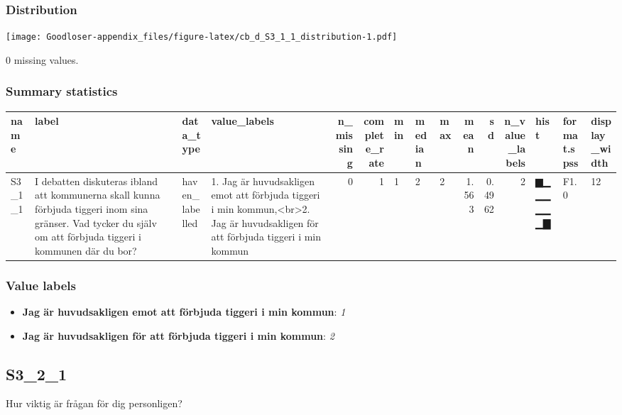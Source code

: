 \documentclass[
]{book}
\providecommand{\tightlist}{%
  \setlength{\itemsep}{0pt}\setlength{\parskip}{0pt}}
\begin{document}
\hypertarget{S3_1_1_distribution}{%
\subsubsection{Distribution}\label{S3_1_1_distribution}}

\texttt{[image: Goodloser-appendix\_files/figure-latex/cb\_d\_S3\_1\_1\_distribution-1.pdf]}

0 missing values.

\hypertarget{S3_1_1_summary}{%
\subsubsection{Summary statistics}\label{S3_1_1_summary}}

\begin{tabular}{l|l|l|l|r|r|l|l|l|r|r|r|l|l|l}
\hline
name & label & data_type & value_labels & n_missing & complete_rate & min & median & max & mean & sd & n_value_labels & hist & format.spss & display_width\\
\hline
S3_1_1 & I debatten diskuteras ibland att kommunerna skall kunna förbjuda tiggeri inom sina gränser. Vad tycker du själv om att förbjuda tiggeri i kommunen där du bor? & haven_labelled & 1. Jag är huvudsakligen emot att förbjuda tiggeri i min kommun,<br>2. Jag är huvudsakligen för att förbjuda tiggeri i min kommun & 0 & 1 & 1 & 2 & 2 & 1.563 & 0.4962 & 2 & ▆▁▁▁▁▁▁▇ & F1.0 & 12\\
\hline
\end{tabular}

\hypertarget{S3_1_1_labels}{%
\subsubsection{Value labels}\label{S3_1_1_labels}}

\begin{itemize}
\tightlist
\item
  \textbf{Jag är huvudsakligen emot att förbjuda tiggeri i min kommun}: \emph{1}
\item
  \textbf{Jag är huvudsakligen för att förbjuda tiggeri i min kommun}: \emph{2}
\end{itemize}

\hypertarget{S3_2_1}{%
\subsection{S3\_2\_1}\label{S3_2_1}}

Hur viktig är frågan för dig personligen?
\end{document}
